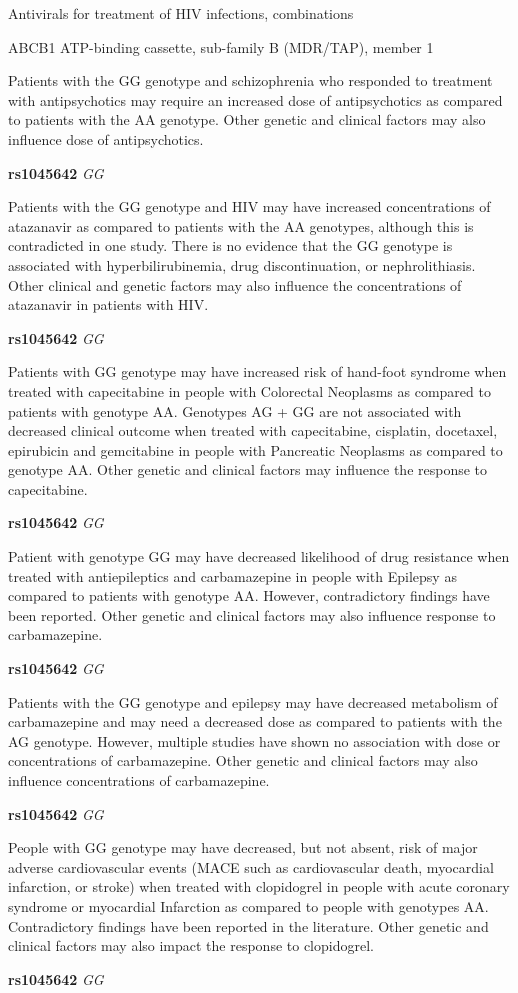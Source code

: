\documentclass{resume} %
\begin{document}
\begin{rSection}{ Antivirals for treatment of HIV infections, combinations }
\begin{rSubsection}{ ABCB1 }{ ATP-binding cassette, sub-family B (MDR/TAP), member 1 }{}{}
\item[] Patients with the GG genotype and schizophrenia who responded to treatment with antipsychotics may require an increased dose of antipsychotics as compared to patients with the AA genotype. Other genetic and clinical factors may also influence dose of antipsychotics. \item \textbf{ rs1045642 } \textit{ GG }
\item[] Patients with the GG genotype and HIV may have increased concentrations of atazanavir as compared to patients with the AA genotypes, although this is contradicted in one study. There is no evidence that the GG genotype is associated with hyperbilirubinemia, drug discontinuation, or nephrolithiasis.  Other clinical and genetic factors may also influence the concentrations of atazanavir in patients with HIV. \item \textbf{ rs1045642 } \textit{ GG }
\item[] Patients with GG genotype may have increased risk of hand-foot syndrome when treated with capecitabine in people with Colorectal Neoplasms as compared to patients with genotype AA. Genotypes AG + GG are not associated with decreased clinical outcome when treated with capecitabine, cisplatin, docetaxel, epirubicin and gemcitabine in people with Pancreatic Neoplasms as compared to genotype AA. Other genetic and clinical factors may influence the response to capecitabine.\item \textbf{ rs1045642 } \textit{ GG }
\item[] Patient with genotype GG may have decreased likelihood of drug resistance when treated with antiepileptics and carbamazepine in people with Epilepsy as compared to patients with genotype AA. However, contradictory findings have been reported. Other genetic and clinical factors may also influence response to carbamazepine.\item \textbf{ rs1045642 } \textit{ GG }
\item[] Patients with the GG genotype and epilepsy may have decreased metabolism of carbamazepine and may need a decreased dose as compared to patients with the AG genotype. However, multiple studies have shown no association with dose or concentrations of carbamazepine. Other genetic and clinical factors may also influence concentrations of carbamazepine.\item \textbf{ rs1045642 } \textit{ GG }
\item[] People with GG  genotype may have decreased, but not absent, risk of major adverse cardiovascular events (MACE such as cardiovascular death, myocardial infarction, or stroke) when treated with clopidogrel in people with acute coronary syndrome or myocardial Infarction as compared to people with genotypes AA. Contradictory findings have been reported in the literature. Other genetic and clinical factors may also impact the response to clopidogrel.\item \textbf{ rs1045642 } \textit{ GG }

\end{rSubsection}
\end{rSection}
\end{document}

